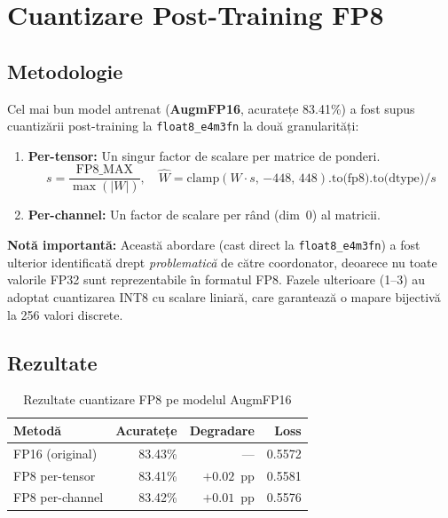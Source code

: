 \documentclass[12pt,a4paper]{article}
\begin{document}
\section{Cuantizare Post-Training FP8}

\subsection{Metodologie}

Cel mai bun model antrenat (\textbf{AugmFP16}, acuratețe 83.41\%) a fost supus
cuantizării post-training la \texttt{float8\_e4m3fn} la două granularități:

\begin{enumerate}
  \item \textbf{Per-tensor:} Un singur factor de scalare per matrice de ponderi.
    \begin{equation}
      s = \frac{\text{FP8\_MAX}}{\max(|W|)}, \quad
      \hat{W} = \text{clamp}(W \cdot s,\, {-448},\, {448}).\text{to(fp8)}.\text{to(dtype)} / s
    \end{equation}
  \item \textbf{Per-channel:} Un factor de scalare per rând (dim~0) al matricii.
\end{enumerate}

\textbf{Notă importantă:} Această abordare (cast direct la \texttt{float8\_e4m3fn})
a fost ulterior identificată drept \emph{problematică} de către coordonator,
deoarece nu toate valorile FP32 sunt reprezentabile în formatul FP8. Fazele
ulterioare (1--3) au adoptat cuantizarea INT8 cu scalare liniară, care
garantează o mapare bijectivă la 256 valori discrete.

\subsection{Rezultate}

\begin{table}[H]
  \centering
  \caption{Rezultate cuantizare FP8 pe modelul AugmFP16}
  \begin{tabular}{lrrr}
    \toprule
    \textbf{Metodă} & \textbf{Acuratețe} & \textbf{Degradare} & \textbf{Loss} \\
    \midrule
    FP16 (original)   & 83.43\% & ---         & 0.5572 \\
    FP8 per-tensor    & 83.41\% & $+0.02$~pp  & 0.5581 \\
    FP8 per-channel   & 83.42\% & $+0.01$~pp  & 0.5576 \\
    \bottomrule
  \end{tabular}
  \label{tab:fp8_results}
\end{table}
\end{document}
